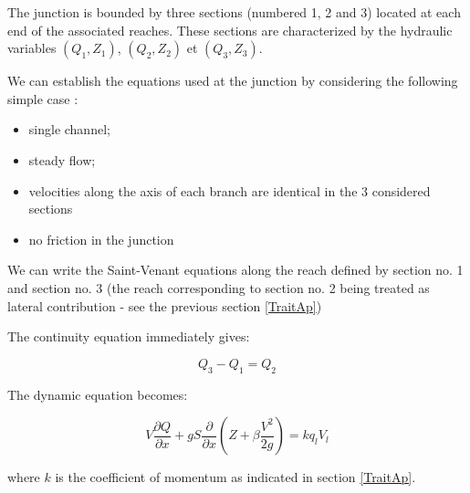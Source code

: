 \vspace{0.5cm}

The junction is bounded by three sections (numbered 1, 2 and 3) located at each end of the associated reaches. These sections are characterized by the hydraulic variables $(Q_1,Z_1)$, $(Q_2,Z_2)$ et $(Q_3,Z_3)$.

\vspace{0.5cm}

We can establish the equations used at the junction by considering the following simple case :
\begin{itemize}
 \item single channel;
 \item steady flow;
 \item velocities along the axis of each branch are identical in the 3 considered sections
 \item no friction in the junction
\end{itemize}

\vspace{0.5cm}

We can write the Saint-Venant equations along the reach defined by section no. 1 and section no. 3 (the reach corresponding to section no. 2 being treated as lateral contribution - see the previous section \ref{TraitAp})


\vspace{0.5cm}

The continuity equation immediately gives:

\begin{equation}
  Q_3 - Q_1 = Q_2
\end{equation}

\vspace{0.5cm}

The dynamic equation becomes:

\begin{equation}
  V \frac{\partial Q}{\partial x} + g S \frac{\partial}{\partial x} \left ( Z + \beta \frac{V^2}{2 g} \right ) = k q_l V_l
\end{equation}

\vspace{0.5cm}

where $k$ is the coefficient of momentum as indicated in section \ref{TraitAp}.

